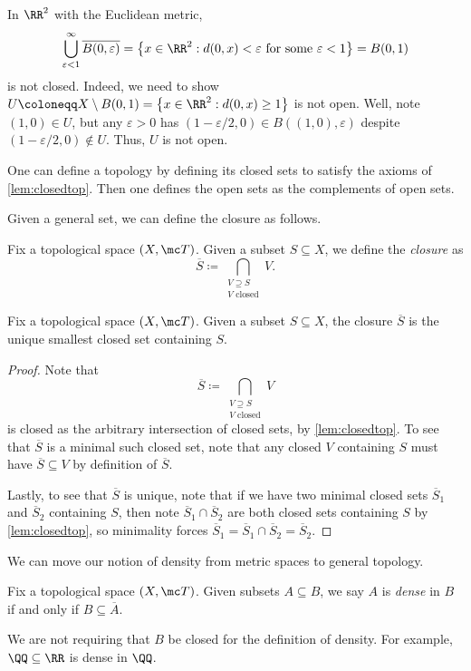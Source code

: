 \documentclass[../notes.tex]{subfiles}
\begin{document}
\begin{remark}
	In $\RR^2$ with the Euclidean metric,
	\[\bigcup_{\varepsilon<1}^\infty\overline{B(0,\varepsilon)}=\left\{x\in\RR^2:d(0,x)<\varepsilon\text{ for some }\varepsilon<1\right\}=B(0,1)\]
	is not closed. Indeed, we need to show $U\coloneqq X\setminus B(0,1)=\left\{x\in\RR^2:d(0,x)\ge1\right\}$ is not open. Well, note $(1,0)\in U$, but any $\varepsilon>0$ has $(1-\varepsilon/2,0)\in B((1,0),\varepsilon)$ despite $(1-\varepsilon/2,0)\notin U$. Thus, $U$ is not open.
\end{remark}
\begin{remark}
	One can define a topology by defining its closed sets to satisfy the axioms of \autoref{lem:closedtop}. Then one defines the open sets as the complements of open sets.
\end{remark}
Given a general set, we can define the closure as follows.
\begin{definition}
	Fix a topological space $(X,\mc T)$. Given a subset $S\subseteq X$, we define the \textit{closure} as
	\[\overline S\coloneqq\bigcap_{\substack{V\supseteq S\\V\text{ closed}}}V.\]
\end{definition}
\begin{lemma}
	Fix a topological space $(X,\mc T)$. Given a subset $S\subseteq X$, the closure $\overline S$ is the unique smallest closed set containing $S$.
\end{lemma}
\begin{proof}
	Note that
	\[\overline S\coloneqq\bigcap_{\substack{V\supseteq S\\V\text{ closed}}}V\]
	is closed as the arbitrary intersection of closed sets, by \autoref{lem:closedtop}. To see that $\overline S$ is a minimal such closed set, note that any closed $V$ containing $S$ must have $\overline S\subseteq V$ by definition of $\overline S$.
	
	Lastly, to see that $\overline S$ is unique, note that if we have two minimal closed sets $\overline S_1$ and $\overline S_2$ containing $S$, then note $\overline S_1\cap\overline S_2$ are both closed sets containing $S$ by \autoref{lem:closedtop}, so minimality forces $\overline S_1=\overline S_1\cap\overline S_2=\overline S_2$.
\end{proof}
We can move our notion of density from metric spaces to general topology.
\begin{defi}[Dense]
	Fix a topological space $(X,\mc T)$. Given subsets $A\subseteq B$, we say $A$ is \textit{dense} in $B$ if and only if $B\subseteq\overline A$.
\end{defi}
\begin{remark}
	We are not requiring that $B$ be closed for the definition of density. For example, $\QQ\subseteq\RR$ is dense in $\QQ$.
\end{remark}
\end{document}
